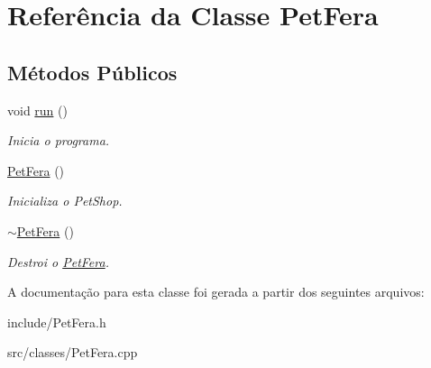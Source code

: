 \hypertarget{classPetFera}{}\section{Referência da Classe Pet\+Fera}
\label{classPetFera}
\subsection*{Métodos Públicos}
\begin{DoxyCompactItemize}
\item 
\mbox{\label{classPetFera_a48b0c975be63743a8ea6cb783af1aa61}} 
void \hyperlink{classPetFera_a48b0c975be63743a8ea6cb783af1aa61}{run} ()
\begin{DoxyCompactList}\small\item\em Inicia o programa. \end{DoxyCompactList}\item 
\mbox{\label{classPetFera_a1d0a2b0e9d459ee1e526c50e381ff82d}} 
\hyperlink{classPetFera_a1d0a2b0e9d459ee1e526c50e381ff82d}{Pet\+Fera} ()
\begin{DoxyCompactList}\small\item\em Inicializa o Pet\+Shop. \end{DoxyCompactList}\item 
\mbox{\label{classPetFera_ab6d608548d1032f06571e0a4db8fd797}} 
\hyperlink{classPetFera_ab6d608548d1032f06571e0a4db8fd797}{$\sim$\+Pet\+Fera} ()
\begin{DoxyCompactList}\small\item\em Destroi o \hyperlink{classPetFera}{Pet\+Fera}. \end{DoxyCompactList}\end{DoxyCompactItemize}


A documentação para esta classe foi gerada a partir dos seguintes arquivos\+:\begin{DoxyCompactItemize}
\item 
include/Pet\+Fera.\+h\item 
src/classes/Pet\+Fera.\+cpp\end{DoxyCompactItemize}
